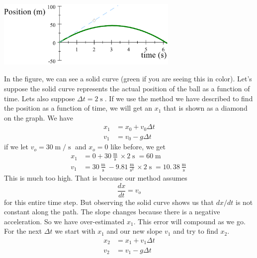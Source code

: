 \documentclass{book}
\begin{document}
 
\begin{center}
\includegraphics[natheight=1.289400in,natwidth=3.437600in,height=1.2894in,width=3.4376in]{Lab7_figs/PvTOnePoint.png}
\end{center}
In the figure, we can see a solid curve (green if you are seeing this in
color). Let's suppose the solid curve represents the actual position of the
ball as a function of time. Lets also suppose $\Delta t=2 \operatorname{s} .$ If we use the method we have described to find the position as a function
of time, we will get an $x_{1}$ that is shown as a diamond on the graph. We
have
\begin{align*}
x_{1}  & =x_{0}+v_{0}\Delta t\\
v_{1}  & =v_{0}-g\Delta t
\end{align*}
if we let $v_{o}=30 \operatorname{m} / \operatorname{s} $ and $x_{o}=0$ like before, we get
\begin{align*}
x_{1}  & =0+30\frac{ \operatorname{m} }{ \operatorname{s} }\times2 \operatorname{s} =60 \operatorname{m} \\
v_{1}  & =30\frac{ \operatorname{m} }{ \operatorname{s} }-9.81\frac{ \operatorname{m} }{ \operatorname{s} ^{2}}\times2 \operatorname{s} =\allowbreak10.\,\allowbreak38\frac{ \operatorname{m} }{ \operatorname{s} } \end{align*}
This is much too high. That is because our method assumes \[
\frac{dx}{dt}=v_{o}
\]
for this entire time step. But observing the solid curve shows us that $dx/dt
$ is not constant along the path. The slope changes because there is a
negative acceleration. So we have over-estimated $x_{1}.$ This error will
compound as we go. For the next $\Delta t$ we start with $x_{1}$ and our new
slope $v_{1}$ and try to find $x_{2}.$
\begin{align*}
x_{2}  & =x_{1}+v_{1}\Delta t\\
v_{2}  & =v_{1}-g\Delta t
\end{align*}
\end{document}
